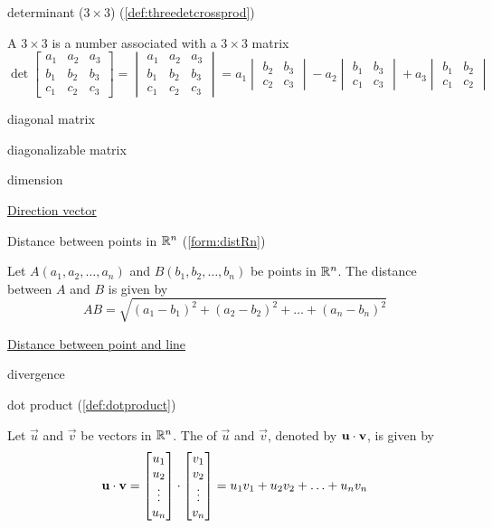 \documentclass{ximera}
\begin{document}
determinant ($3\times 3$) (\ref{def:threedetcrossprod})
\begin{expandable}
    A $3\times 3$  is a number associated with a $3\times 3$ matrix
$$\det{\begin{bmatrix}
a_1 & a_2 & a_3\\
b_1 & b_2 &b_3\\
c_1 &c_2 &c_3
\end{bmatrix}}=
\begin{vmatrix}
a_1 & a_2 & a_3\\
b_1 & b_2 &b_3\\
c_1 &c_2 &c_3
\end{vmatrix} =a_1
\begin{vmatrix}
b_2 & b_3\\
c_2 & c_3
\end{vmatrix} -a_2
\begin{vmatrix}
b_1 & b_3\\
c_1 & c_3
\end{vmatrix} +a_3
\begin{vmatrix}
b_1 & b_2\\
c_1 & c_2
\end{vmatrix}
$$
\end{expandable}

diagonal matrix

diagonalizable matrix

dimension

\href{https://ximera.osu.edu/oerlinalg/LinearAlgebra/RRN-0020/main}{Direction vector}

Distance between points in $\mathbb{R}^n$ (\ref{form:distRn})
\begin{expandable}
Let $A(a_1, a_2,\ldots ,a_n)$ and $B(b_1, b_2,\ldots ,b_n)$ be points in $\mathbb{R}^n$.  The distance between $A$ and $B$ is given by
$$AB=\sqrt{(a_1-b_1)^2+(a_2-b_2)^2+\ldots +(a_n-b_n)^2}$$
\end{expandable}

\href{https://ximera.osu.edu/oerlinalg/LinearAlgebra/VEC-0070/main}{Distance between point and line}

divergence

dot product (\ref{def:dotproduct})
\begin{expandable}
  Let $\vec{u}$ and $\vec{v}$ be vectors in $\mathbb{R}^n$.  The  of $\vec{u}$ and $\vec{v}$, denoted by
  $\mathbf{u}\cdot \mathbf{v}$, is given by
$$\mathbf{u}\cdot\mathbf{v}=\begin{bmatrix}u_1\\u_2\\\vdots\\u_n\end{bmatrix}\cdot\begin{bmatrix}v_1\\v_2\\\vdots\\v_n\end{bmatrix}=u_1v_1+u_2v_2+\ldots+u_nv_n$$
\end{expandable}
\end{document}
